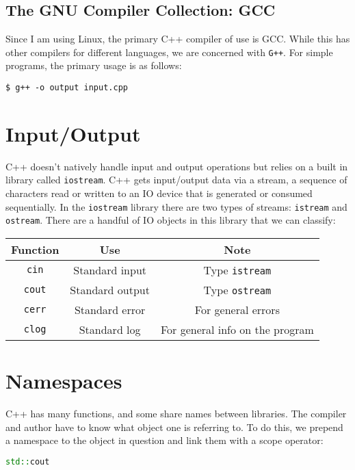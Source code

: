 \documentclass[12pt, a4paper]{report}
\begin{document}
\subsection{The GNU Compiler Collection: GCC}
Since I am using Linux, the primary C++ compiler of use is GCC. While this has other compilers for different languages, we are concerned with \verb|G++|.
For simple programs, the primary usage is as follows: 

\begin{center}
	\verb|$ g++ -o output input.cpp|
\end{center}

\section{Input/Output}
C++ doesn't natively handle input and output operations but relies on a built in library called \verb|iostream|. C++ gets input/output data via a stream, a sequence of characters read or written to an IO device that is generated or consumed sequentially. 
In the \verb|iostream| library there are two types of streams: \verb|istream| and \verb|ostream|. There are a handful of IO objects in this library that we can classify:

\begin{center}
	\begin{tabular}{ |c|c|c| }
		\hline
		\textbf{Function} & \textbf{Use} & \textbf{Note} \\
		\hline
		\verb|cin| & Standard input & Type \verb|istream| \\
		\hline
		\verb|cout| & Standard output & Type \verb|ostream| \\
		\hline
		\verb|cerr| & Standard error & For general errors \\
		\hline
		\verb|clog| & Standard log & For general info on the program \\
		\hline
	\end{tabular}
\end{center}

\section{Namespaces}
C++ has many functions, and some share names between libraries. The compiler and author have to know what object one is referring to. To do this, we prepend a namespace to the object in question and link them with a scope operator:

\begin{lstlisting}[language=C++]
	std::cout
\end{lstlisting}
\end{document}
